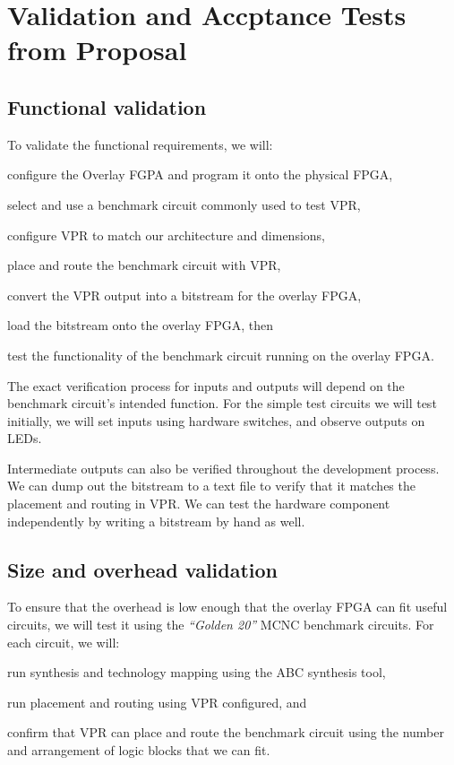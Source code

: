 \section{Validation and Accptance Tests from Proposal} %

\subsection{Functional validation}

To validate the functional requirements, we will:
\begin{enumeration}
	\item configure the Overlay FGPA and program it onto the physical FPGA,
	\item select and use a benchmark circuit commonly used to test VPR,
	\item configure VPR to match our architecture and dimensions,
	\item place and route the benchmark circuit with VPR,
	\item convert the VPR output into a bitstream for the overlay FPGA,
	\item load the bitstream onto the overlay FPGA, then 
	\item test the functionality of the benchmark circuit running on the overlay FPGA.
\end{enumeration}

The exact verification process for inputs and outputs will depend on the benchmark circuit's intended function.
For the simple test circuits we will test initially, we will set inputs using hardware switches, and observe outputs on LEDs.

Intermediate outputs can also be verified throughout the development process.
We can dump out the bitstream to a text file to verify that it matches the placement and routing in VPR.
We can test the hardware component independently by writing a bitstream by hand as well.


\subsection{Size and overhead validation}

To ensure that the overhead is low enough that the overlay FPGA can fit useful circuits, we will test it using the \emph{``Golden 20''} MCNC benchmark circuits.
For each circuit, we will:
\begin{enumeration}
	\item run synthesis and technology mapping using the ABC synthesis tool,
	\item run placement and routing using VPR configured, and
	\item confirm that VPR can place and route the benchmark circuit using the number and arrangement of logic blocks that we can fit.
\end{enumeration}

